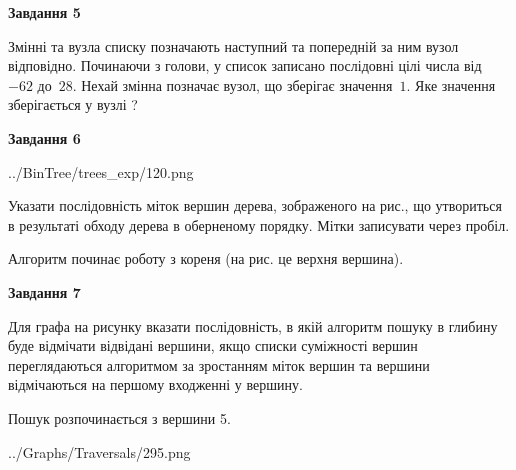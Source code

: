 \documentclass[12pt, ukrainian]{article}
\begin{document}
{\begin {large}
{\begin {center}\textbf{Завдання 5}\end {center}}\par
Змінні  та  вузла списку позначають наступний та попередній за ним вузол відповідно. Починаючи з голови, у список записано послідовні цілі числа від~$-62$ до~$28$. Нехай змінна  позначає вузол, що зберігає значення~$1$.
Яке значення зберігається у вузлі  ?\par
\newpage

{\begin {center}\textbf{Завдання 6}\end {center}}\par

\begin{center}
	{../BinTree/trees_exp/120.png}
\end{center}
Указати послідовність міток вершин дерева, зображеного на рис., що утвориться в результаті обходу дерева в оберненому порядку. Мітки записувати через пробіл.\par Алгоритм починає роботу з кореня (на рис. це верхня вершина).\par
\newpage

{\begin {center}\textbf{Завдання 7}\end {center}}\par
Для графа на рисунку вказати послідовність, в якій алгоритм пошуку в глибину буде відмічати відвідані вершини, якщо списки суміжності вершин переглядаються алгоритмом за зростанням міток вершин та вершини відмічаються на першому вход\-женні у вершину.\par
Пошук розпочинається з вершини 5.\par

\begin{center}
	{../Graphs/Traversals/295.png}
\end{center}\par
\newpage


\end{large}}
\end{document}
